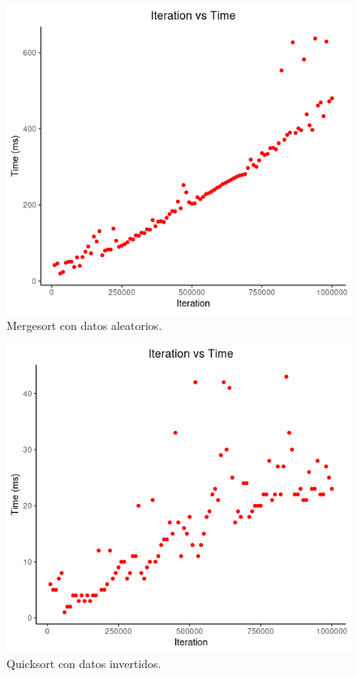 \documentclass[paper=a4, fontsize=11pt]{scrartcl} %
\numberwithin{equation}{section} %
\numberwithin{figure}{section} %
\numberwithin{table}{section} %
\begin{document}
\begin{figure}
    \includegraphics[width=\linewidth]{merge_random.png}
    \caption{Mergesort con datos aleatorios.}
\end{figure}


\begin{figure}
    \includegraphics[width=\linewidth]{quick_inverse.png}
    \caption{Quicksort con datos invertidos.}
\end{figure}
\end{document}

